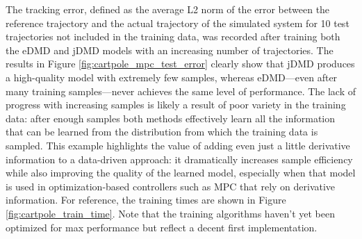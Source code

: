 \documentclass{article}
\begin{document}
The tracking error, defined as the average L2 norm of the error between the reference 
trajectory and the actual trajectory of the simulated system for 10 test trajectories not 
included in the training data, was recorded after training both the eDMD and jDMD models
with an increasing number of trajectories. The results in Figure
\ref{fig:cartpole_mpc_test_error} clearly show that jDMD produces a high-quality model with
extremely few samples, whereas eDMD---even after many training samples---never achieves the 
same level of performance. The lack of progress with increasing samples is likely a result 
of poor variety in the training data: after enough samples both methods effectively learn 
all the information that can be learned from the distribution from which the training data 
is sampled. This example highlights the value of adding even just a little derivative 
information to a data-driven approach: it dramatically increases sample efficiency while 
also improving the quality of the learned model, especially when that model is used in 
optimization-based controllers such as MPC that rely on derivative information. For 
reference, the training times are shown in Figure \ref{fig:cartpole_train_time}. Note that 
the training algorithms haven't yet been optimized for max performance but reflect a decent 
first implementation.






\end{document}
